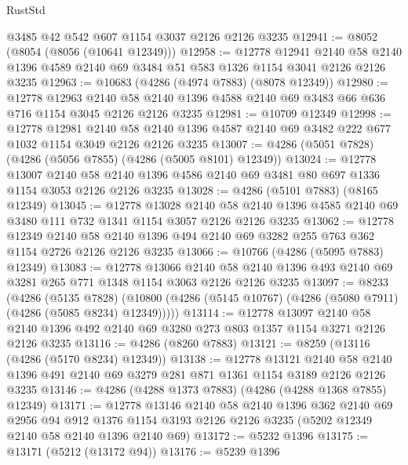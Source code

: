 \begin{lexlean}{RustStd}
\begin{coremodule}
    @3485
    @42
    @542
    @607
    @1154
    @3037
    @2126
    @2126
    @3235
@12941 := @8052 (@8054 (@8056 (@10641 @12349)))
@12958 := @12778
    @12941
    @2140
    @58
    @2140
    @1396
    @4589
    @2140
    @69
    @3484
    @51
    @583
    @1326
    @1154
    @3041
    @2126
    @2126
    @3235
@12963 := @10683 (@4286 (@4974 @7883) (@8078 @12349))
@12980 := @12778
    @12963
    @2140
    @58
    @2140
    @1396
    @4588
    @2140
    @69
    @3483
    @66
    @636
    @716
    @1154
    @3045
    @2126
    @2126
    @3235
@12981 := @10709 @12349
@12998 := @12778
    @12981
    @2140
    @58
    @2140
    @1396
    @4587
    @2140
    @69
    @3482
    @222
    @677
    @1032
    @1154
    @3049
    @2126
    @2126
    @3235
@13007 := @4286 (@5051 @7828) (@4286 (@5056 @7855) (@4286 (@5005 @8101) @12349))
@13024 := @12778
    @13007
    @2140
    @58
    @2140
    @1396
    @4586
    @2140
    @69
    @3481
    @80
    @697
    @1336
    @1154
    @3053
    @2126
    @2126
    @3235
@13028 := @4286 (@5101 @7883) (@8165 @12349)
@13045 := @12778
    @13028
    @2140
    @58
    @2140
    @1396
    @4585
    @2140
    @69
    @3480
    @111
    @732
    @1341
    @1154
    @3057
    @2126
    @2126
    @3235
@13062 := @12778
    @12349
    @2140
    @58
    @2140
    @1396
    @494
    @2140
    @69
    @3282
    @255
    @763
    @362
    @1154
    @2726
    @2126
    @2126
    @3235
@13066 := @10766 (@4286 (@5095 @7883) @12349)
@13083 := @12778
    @13066
    @2140
    @58
    @2140
    @1396
    @493
    @2140
    @69
    @3281
    @265
    @771
    @1348
    @1154
    @3063
    @2126
    @2126
    @3235
@13097 := @8233
    (@4286
      (@5135 @7828)
      (@10800 (@4286 (@5145 @10767) (@4286 (@5080 @7911) (@4286 (@5085 @8234) @12349)))))
@13114 := @12778
    @13097
    @2140
    @58
    @2140
    @1396
    @492
    @2140
    @69
    @3280
    @273
    @803
    @1357
    @1154
    @3271
    @2126
    @2126
    @3235
@13116 := @4286 (@8260 @7883)
@13121 := @8259 (@13116 (@4286 (@5170 @8234) @12349))
@13138 := @12778
    @13121
    @2140
    @58
    @2140
    @1396
    @491
    @2140
    @69
    @3279
    @281
    @871
    @1361
    @1154
    @3189
    @2126
    @2126
    @3235
@13146 := @4286 (@4288 @1373 @7883) (@4286 (@4288 @1368 @7855) @12349)
@13171 := @12778
    @13146
    @2140
    @58
    @2140
    @1396
    @362
    @2140
    @69
    @2956
    @94
    @912
    @1376
    @1154
    @3193
    @2126
    @2126
    @3235
    (@5202 @12349 @2140 @58 @2140 @1396 @2140 @69)
@13172 := @5232 @1396
@13175 := @13171 (@5212 (@13172 @94))
@13176 := @5239 @1396

\end{coremodule}
\end{lexlean}
